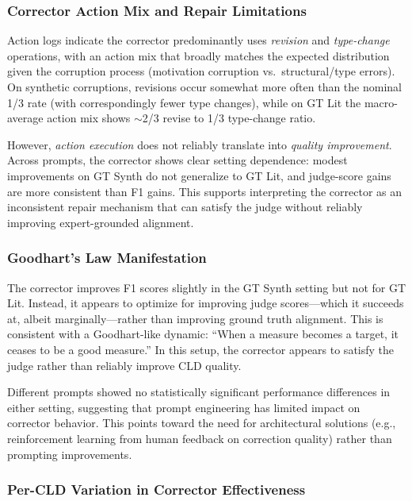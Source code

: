 \subsubsection{Corrector Action Mix and Repair Limitations}

Action logs indicate the corrector predominantly uses \textit{revision} and \textit{type-change} operations, with an action mix that broadly matches the expected distribution given the corruption process (motivation corruption vs.\ structural/type errors). On synthetic corruptions, revisions occur somewhat more often than the nominal 1/3 rate (with correspondingly fewer type changes), while on GT Lit the macro-average action mix shows $\sim$2/3 revise to 1/3 type-change ratio.

However, \textit{action execution} does not reliably translate into \textit{quality improvement}. Across prompts, the corrector shows clear setting dependence: modest improvements on GT Synth do not generalize to GT Lit, and judge-score gains are more consistent than F1 gains. This supports interpreting the corrector as an inconsistent repair mechanism that can satisfy the judge without reliably improving expert-grounded alignment.

\subsubsection{Goodhart's Law Manifestation}

The corrector improves F1 scores slightly in the GT Synth setting but not for GT Lit. Instead, it appears to optimize for improving judge scores---which it succeeds at, albeit marginally---rather than improving ground truth alignment. This is consistent with a Goodhart-like dynamic: ``When a measure becomes a target, it ceases to be a good measure.'' In this setup, the corrector appears to satisfy the judge rather than reliably improve CLD quality.

Different prompts showed no statistically significant performance differences in either setting, suggesting that prompt engineering has limited impact on corrector behavior. This points toward the need for architectural solutions (e.g., reinforcement learning from human feedback on correction quality) rather than prompting improvements.

\subsubsection{Per-CLD Variation in Corrector Effectiveness}

